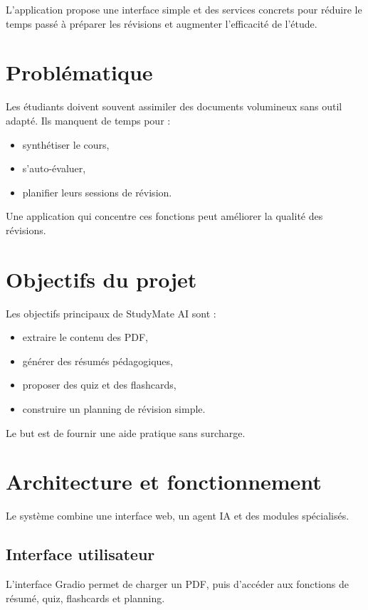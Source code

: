 ﻿\documentclass[12pt,a4paper]{report}
\begin{document}
L'application propose une interface simple et des services concrets pour réduire le temps passé à préparer les révisions et augmenter l'efficacité de l'étude.

\chapter{Problématique}
Les étudiants doivent souvent assimiler des documents volumineux sans outil adapté. Ils manquent de temps pour :
\begin{itemize}
    \item synthétiser le cours,
    \item s'auto-évaluer,
    \item planifier leurs sessions de révision.
\end{itemize}

Une application qui concentre ces fonctions peut améliorer la qualité des révisions.

\chapter{Objectifs du projet}
Les objectifs principaux de StudyMate AI sont :
\begin{itemize}
    \item extraire le contenu des PDF,
    \item générer des résumés pédagogiques,
    \item proposer des quiz et des flashcards,
    \item construire un planning de révision simple.
\end{itemize}

Le but est de fournir une aide pratique sans surcharge.

\chapter{Architecture et fonctionnement}
Le système combine une interface web, un agent IA et des modules spécialisés.

\section{Interface utilisateur}
L'interface Gradio permet de charger un PDF, puis d'accéder aux fonctions de résumé, quiz, flashcards et planning.
\end{document}
